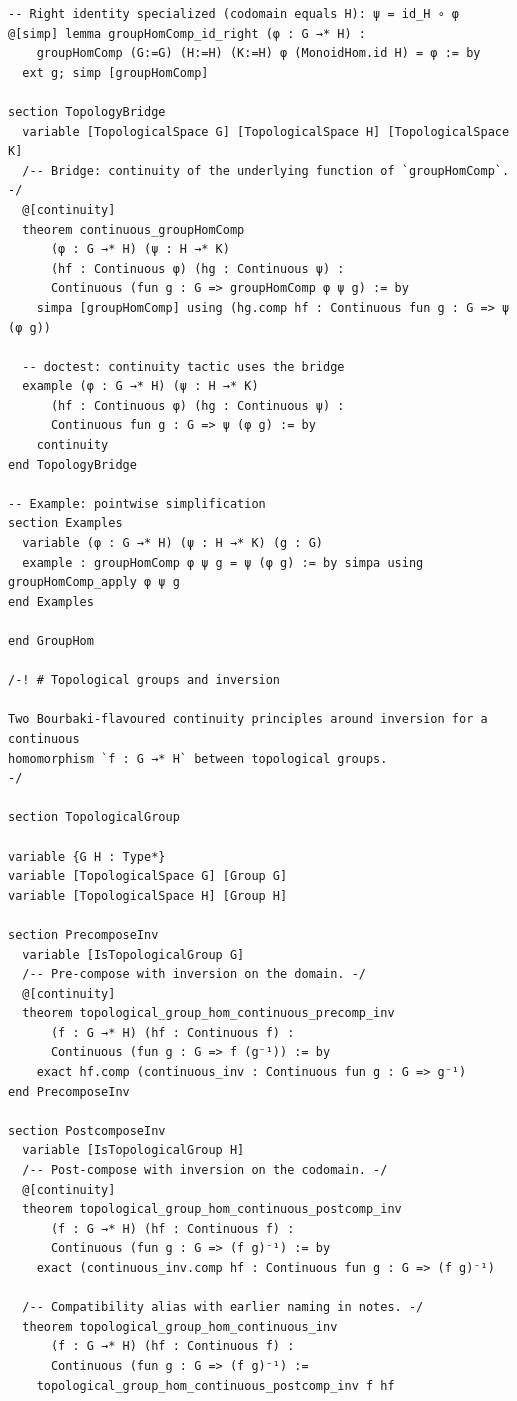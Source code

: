 \documentclass[11pt]{article}
\theoremstyle{definition}
\begin{document}
\begin{lstlisting}[language=lean]
-- Right identity specialized (codomain equals H): ψ = id_H ∘ φ
@[simp] lemma groupHomComp_id_right (φ : G →* H) :
    groupHomComp (G:=G) (H:=H) (K:=H) φ (MonoidHom.id H) = φ := by
  ext g; simp [groupHomComp]

section TopologyBridge
  variable [TopologicalSpace G] [TopologicalSpace H] [TopologicalSpace K]
  /-- Bridge: continuity of the underlying function of `groupHomComp`. -/
  @[continuity]
  theorem continuous_groupHomComp
      (φ : G →* H) (ψ : H →* K)
      (hf : Continuous φ) (hg : Continuous ψ) :
      Continuous (fun g : G => groupHomComp φ ψ g) := by
    simpa [groupHomComp] using (hg.comp hf : Continuous fun g : G => ψ (φ g))

  -- doctest: continuity tactic uses the bridge
  example (φ : G →* H) (ψ : H →* K)
      (hf : Continuous φ) (hg : Continuous ψ) :
      Continuous fun g : G => ψ (φ g) := by
    continuity
end TopologyBridge

-- Example: pointwise simplification
section Examples
  variable (φ : G →* H) (ψ : H →* K) (g : G)
  example : groupHomComp φ ψ g = ψ (φ g) := by simpa using groupHomComp_apply φ ψ g
end Examples

end GroupHom

/-! # Topological groups and inversion

Two Bourbaki-flavoured continuity principles around inversion for a continuous
homomorphism `f : G →* H` between topological groups.
-/

section TopologicalGroup

variable {G H : Type*}
variable [TopologicalSpace G] [Group G]
variable [TopologicalSpace H] [Group H]

section PrecomposeInv
  variable [IsTopologicalGroup G]
  /-- Pre-compose with inversion on the domain. -/
  @[continuity]
  theorem topological_group_hom_continuous_precomp_inv
      (f : G →* H) (hf : Continuous f) :
      Continuous (fun g : G => f (g⁻¹)) := by
    exact hf.comp (continuous_inv : Continuous fun g : G => g⁻¹)
end PrecomposeInv

section PostcomposeInv
  variable [IsTopologicalGroup H]
  /-- Post-compose with inversion on the codomain. -/
  @[continuity]
  theorem topological_group_hom_continuous_postcomp_inv
      (f : G →* H) (hf : Continuous f) :
      Continuous (fun g : G => (f g)⁻¹) := by
    exact (continuous_inv.comp hf : Continuous fun g : G => (f g)⁻¹)

  /-- Compatibility alias with earlier naming in notes. -/
  theorem topological_group_hom_continuous_inv
      (f : G →* H) (hf : Continuous f) :
      Continuous (fun g : G => (f g)⁻¹) :=
    topological_group_hom_continuous_postcomp_inv f hf


\end{lstlisting}
\end{document}
